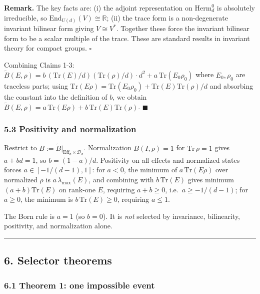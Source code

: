 \documentclass[
]{article}
\begin{document}
\textbf{Remark.} The key facts are: (i) the adjoint representation on
\(\mathrm{Herm}_d^0\) is absolutely irreducible, so
\(\mathrm{End}_{U(d)}(V)\cong\mathbb R\); (ii) the trace form is a
non-degenerate invariant bilinear form giving \(V\cong V^*\). Together
these force the invariant bilinear form to be a scalar multiple of the
trace. These are standard results in invariant theory for compact
groups. \(\square\)

Combining Claims 1-3:
\(\widetilde B(E,\rho)=b\,(\mathrm{Tr}(E)/d)(\mathrm{Tr}(\rho)/d)\cdot d^2 + a\,\mathrm{Tr}(E_0\rho_0)\)
where \(E_0,\rho_0\) are traceless parts; using
\(\mathrm{Tr}(E\rho)=\mathrm{Tr}(E_0\rho_0)+\mathrm{Tr}(E)\mathrm{Tr}(\rho)/d\)
and absorbing the constant into the definition of \(b\), we obtain
\(\widetilde B(E,\rho)=a\,\mathrm{Tr}(E\rho)+b\,\mathrm{Tr}(E)\mathrm{Tr}(\rho)\).
\(\blacksquare\)

\subsubsection{5.3 Positivity and
normalization}\label{positivity-and-normalization}

Restrict to \(B:=\widetilde B|_{\mathrm{Eff}_d\times\mathcal D_d}\).
Normalization \(B(I,\rho)=1\) for \(\mathrm{Tr}\,\rho=1\) gives
\(a+bd=1\), so \(b=(1-a)/d\). Positivity on all effects and normalized
states forces \(a\in[-1/(d-1),1]\): for \(a<0\), the minimum of
\(a\,\mathrm{Tr}(E\rho)\) over normalized \(\rho\) is
\(a\,\lambda_{\max}(E)\), and combining with \(b\,\mathrm{Tr}(E)\) gives
minimum \((a+b)\mathrm{Tr}(E)\) on rank-one \(E\), requiring
\(a+b\geq 0\), i.e.~\(a\geq -1/(d-1)\); for \(a\geq 0\), the minimum is
\(b\,\mathrm{Tr}(E)\geq 0\), requiring \(a\leq 1\).

The Born rule is \(a=1\) (so \(b=0\)). It is \emph{not} selected by
invariance, bilinearity, positivity, and normalization alone.

\begin{center}\rule{0.5\linewidth}{0.5pt}\end{center}

\subsection{6. Selector theorems}\label{selector-theorems}

\subsubsection{6.1 Theorem 1: one impossible
event}\label{theorem-1-one-impossible-event}
\end{document}
